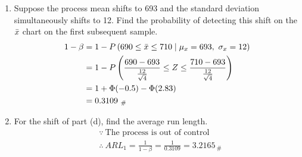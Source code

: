 \begin{enumerate}
    \item Suppose the process mean shifts to 693 and the standard deviation simultaneously shifts to 12. Find the probability of detecting this shift on the $\Bar{x}$ chart on the first subsequent sample.
    \begin{align*}
            1 - \beta &= 1 - P\left(690 \leq \Bar{x} \leq 710  \mid \mu_{x} = 693, \ \sigma_{x} = 12 \right)\\
            &= 1 - P\left(\frac{690 - 693}{\frac{12}{\sqrt{4}}} \leq Z \leq \frac{710 - 693}{\frac{12}{\sqrt{4}}} \right)\\
            &= 1 + \Phi(-0.5) - \Phi(2.83)\\
            &= 0.3109_{\ \#}
        \end{align*}
    
    \item For the shift of part (d), find the average run length.
        \begin{align*}
            &\because \ \text{The process is out of control}\\
            &\therefore \ ARL_1 = \frac{1}{1-\beta} = \frac{1}{0.3109} = 3.2165_{\ \#}\\
        \end{align*}
    
\end{enumerate}